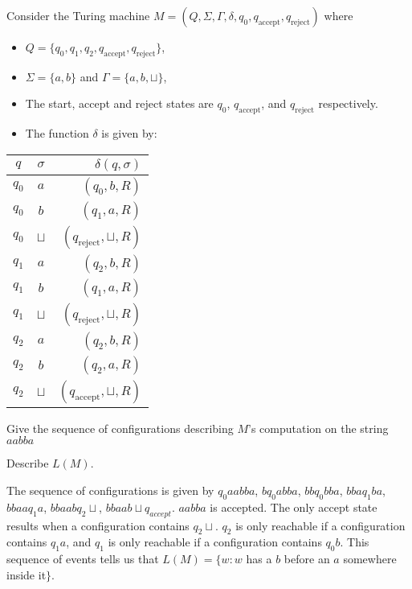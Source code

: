 \documentclass[solution, letterpaper]{cs121}
\begin{document}



 Consider the Turing machine $M=(Q, \Sigma,
\Gamma,\delta, q_0, q_{\mathrm{accept}}, q_{\mathrm{reject}})$
where\begin{itemize}\item
$Q = \{q_0, q_1, q_2, q_{\mathrm{accept}},q_{\mathrm{reject}}\}$,
\item $\Sigma = \{a,b\}$ and $\Gamma =\{a,b,\sqcup\}$, \item The
start, accept and reject states are $q_0$, $q_{\mathrm{accept}}$,
and $q_{\mathrm{reject}}$ respectively. \item The function
$\delta$ is given
by:\end{itemize}\begin{center}\begin{tabular}{cc|r}$q$ & $\sigma$
& $\delta(q, \sigma)$ \\ \hline\hline$q_0$ & $a$ & $(q_0, b,
R)$\\$q_0$ & $b$ & $(q_1, a, R)$\\$q_0$ & $\sqcup$ &
$(q_{\mathrm{reject}}, \sqcup, R)$\\$q_1$ & $a$ & $(q_2, b,
R)$\\$q_1$ & $b$ & $(q_1, a, R)$\\$q_1$ & $\sqcup$ &
$(q_{\mathrm{reject}}, \sqcup, R)$\\$q_2$ & $a$ & $(q_2, b,
R)$\\$q_2$ & $b$ & $(q_2, a, R)$\\$q_2$ & $\sqcup$ &
$(q_{\mathrm{accept}}, \sqcup,
R)$\\\end{tabular}\end{center}

\subproblem Give the sequence of configurations describing $M$'s computation
on the string $aabba$

\subproblem Describe $L(M)$.


\begin{solution}
\subsolution The sequence of configurations is given by $q_0aabba$, $bq_0abba$, $bbq_0bba$, $bbaq_1ba$, $bbaaq_1a$, $bbaabq_2\sqcup$, $bbaab\sqcup q_{accept}$.  $aabba$ is accepted.
\subsolution The only accept state results when a configuration contains $q_2\sqcup$.  $q_2$ is only reachable if a configuration contains $q_1a$, and $q_1$ is only reachable if a configuration contains $q_0b$.  This sequence of events tells us that $L(M) = \{w: w$ has a $b$ before an $a$ somewhere inside it$\}$.
\end{solution}
\end{document}
